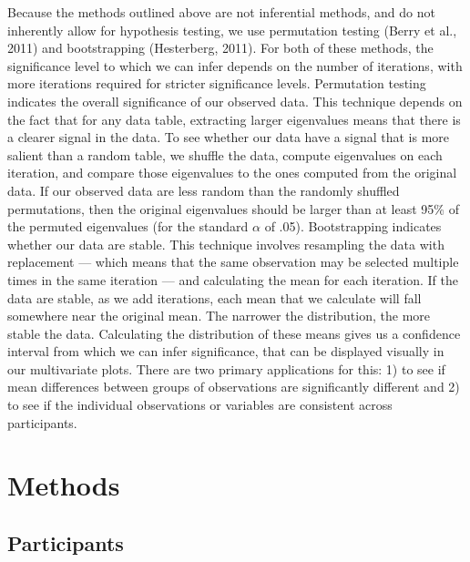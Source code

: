 \documentclass[
  english,
  man,floatsintext]{apa6}
\begin{document}
Because the methods outlined above are not inferential methods, and do not inherently allow for hypothesis testing, we use permutation testing (Berry et al., 2011) and bootstrapping (Hesterberg, 2011). For both of these methods, the significance level to which we can infer depends on the number of iterations, with more iterations required for stricter significance levels.
Permutation testing indicates the overall significance of our observed data. This technique depends on the fact that for any data table, extracting larger eigenvalues means that there is a clearer signal in the data. To see whether our data have a signal that is more salient than a random table, we shuffle the data, compute eigenvalues on each iteration, and compare those eigenvalues to the ones computed from the original data. If our observed data are less random than the randomly shuffled permutations, then the original eigenvalues should be larger than at least 95\% of the permuted eigenvalues (for the standard \(\alpha\) of .05).
Bootstrapping indicates whether our data are stable. This technique involves resampling the data with replacement --- which means that the same observation may be selected multiple times in the same iteration --- and calculating the mean for each iteration. If the data are stable, as we add iterations, each mean that we calculate will fall somewhere near the original mean. The narrower the distribution, the more stable the data. Calculating the distribution of these means gives us a confidence interval from which we can infer significance, that can be displayed visually in our multivariate plots. There are two primary applications for this: 1) to see if mean differences between groups of observations are significantly different and 2) to see if the individual observations or variables are consistent across participants.

\hypertarget{methods}{%
\section{Methods}\label{methods}}

\hypertarget{participants}{%
\subsection{Participants}\label{participants}}
\end{document}
